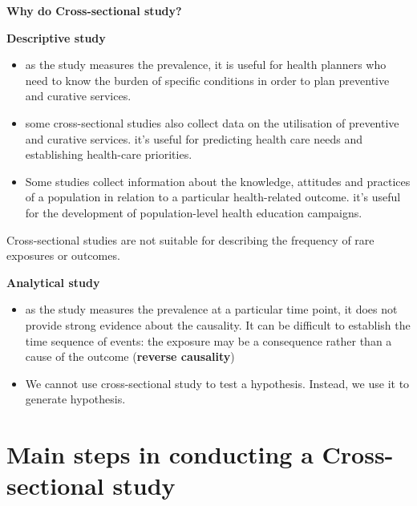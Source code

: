 \documentclass[
  letterpaper,
  DIV=11,
  numbers=noendperiod]{scrreprt}
\begin{document}
\textbf{Why do Cross-sectional study?}

\textbf{Descriptive study}

\begin{itemize}
\item
  as the study measures the prevalence, it is useful for health planners
  who need to know the burden of specific conditions in order to plan
  preventive and curative services.
\item
  some cross-sectional studies also collect data on the utilisation of
  preventive and curative services. it's useful for predicting health
  care needs and establishing health-care priorities.
\item
  Some studies collect information about the knowledge, attitudes and
  practices of a population in relation to a particular health-related
  outcome. it's useful for the development of population-level health
  education campaigns.
\end{itemize}

\begin{tcolorbox}[enhanced jigsaw, bottomtitle=1mm, breakable, colframe=quarto-callout-important-color-frame, leftrule=.75mm, opacityback=0, opacitybacktitle=0.6, left=2mm, colbacktitle=quarto-callout-important-color!10!white, coltitle=black, rightrule=.15mm, toptitle=1mm, colback=white, titlerule=0mm, title=\textcolor{quarto-callout-important-color}{\faExclamation}\hspace{0.5em}{Important}, arc=.35mm, bottomrule=.15mm, toprule=.15mm]

Cross-sectional studies are not suitable for describing the frequency of
rare exposures or outcomes.

\end{tcolorbox}

\textbf{Analytical study}

\begin{itemize}
\item
  as the study measures the prevalence at a particular time point, it
  does not provide strong evidence about the causality. It can be
  difficult to establish the time sequence of events: the exposure may
  be a consequence rather than a cause of the outcome (\textbf{reverse
  causality})
\item
  We cannot use cross-sectional study to test a hypothesis. Instead, we
  use it to generate hypothesis.
\end{itemize}

\hypertarget{main-steps-in-conducting-a-cross-sectional-study}{%
\section{Main steps in conducting a Cross-sectional
study}\label{main-steps-in-conducting-a-cross-sectional-study}}
\end{document}
